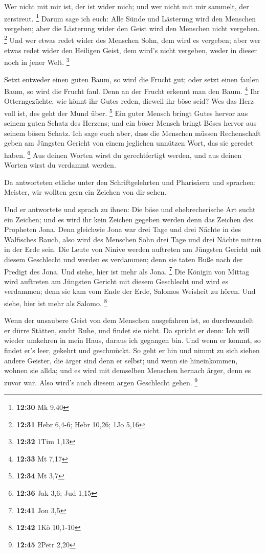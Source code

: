  Wer nicht mit mir ist, der ist wider mich; und wer nicht
mit mir sammelt, der zerstreut. \footnote{\textbf{12:30} Mk 9,40}
 Darum sage ich euch: Alle Sünde und Lästerung wird den
Menschen vergeben; aber die Lästerung wider den Geist wird den Menschen
nicht vergeben. \footnote{\textbf{12:31} Hebr 6,4-6; Hebr 10,26; 1Jo
  5,16}  Und wer etwas redet wider des Menschen Sohn, dem
wird es vergeben; aber wer etwas redet wider den Heiligen Geist, dem
wird's nicht vergeben, weder in dieser noch in jener Welt. \footnote{\textbf{12:32}
  1Tim 1,13}

 Setzt entweder einen guten Baum, so wird die Frucht gut;
oder setzt einen faulen Baum, so wird die Frucht faul. Denn an der
Frucht erkennt man den Baum. \footnote{\textbf{12:33} Mt 7,17}
 Ihr Otterngezüchte, wie könnt ihr Gutes reden, dieweil ihr
böse seid? Wes das Herz voll ist, des geht der Mund über. \footnote{\textbf{12:34}
  Mt 3,7}  Ein guter Mensch bringt Gutes hervor aus seinem
guten Schatz des Herzens; und ein böser Mensch bringt Böses hervor aus
seinem bösen Schatz.  Ich sage euch aber, dass die Menschen
müssen Rechenschaft geben am Jüngsten Gericht von einem jeglichen
unnützen Wort, das sie geredet haben. \footnote{\textbf{12:36} Jak 3,6;
  Jud 1,15}  Aus deinen Worten wirst du gerechtfertigt
werden, und aus deinen Worten wirst du verdammt werden.

 Da antworteten etliche unter den Schriftgelehrten und
Pharisäern und sprachen: Meister, wir wollten gern ein Zeichen von dir
sehen.

 Und er antwortete und sprach zu ihnen: Die böse und
ehebrecherische Art sucht ein Zeichen; und es wird ihr kein Zeichen
gegeben werden denn das Zeichen des Propheten Jona.  Denn
gleichwie Jona war drei Tage und drei Nächte in des Walfisches Bauch,
also wird des Menschen Sohn drei Tage und drei Nächte mitten in der Erde
sein.  Die Leute von Ninive werden auftreten am Jüngsten
Gericht mit diesem Geschlecht und werden es verdammen; denn sie taten
Buße nach der Predigt des Jona. Und siehe, hier ist mehr als Jona.
\footnote{\textbf{12:41} Jon 3,5}  Die Königin von Mittag
wird auftreten am Jüngsten Gericht mit diesem Geschlecht und wird es
verdammen; denn sie kam vom Ende der Erde, Salomos Weisheit zu hören.
Und siehe, hier ist mehr als Salomo. \footnote{\textbf{12:42} 1Kö
  10,1-10}

 Wenn der unsaubere Geist von dem Menschen ausgefahren ist,
so durchwandelt er dürre Stätten, sucht Ruhe, und findet sie nicht.
 Da spricht er denn: Ich will wieder umkehren in mein Haus,
daraus ich gegangen bin. Und wenn er kommt, so findet er's leer, gekehrt
und geschmückt.  So geht er hin und nimmt zu sich sieben
andere Geister, die ärger sind denn er selbst; und wenn sie
hineinkommen, wohnen sie allda; und es wird mit demselben Menschen
hernach ärger, denn es zuvor war. Also wird's auch diesem argen
Geschlecht gehen. \footnote{\textbf{12:45} 2Petr 2,20}

